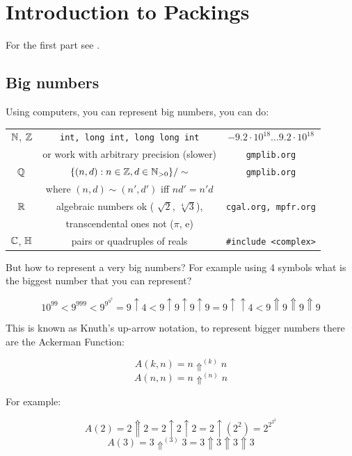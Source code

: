 \setcounter{chapter}{5}
\chapter{Introduction to Packings}



For the first part see \cite{Pfeifle}.
\section{Big numbers}

Using computers, you can represent big numbers, you can do: 

\renewcommand{\arraystretch}{1.5}
\begin{tabular}{|c|c|c|}
\hline
$\mathbb{N}$, $\mathbb{Z}$	 	&\texttt{int, long int, long long int} 			&$-9.2 \cdot 10^{18} ... 9.2 \cdot 10^{18}$	\\
			&or work with arbitrary precision (slower)		&\texttt{gmplib.org}				\\
\hline
$\mathbb{Q}$			&$\{(n, d) : n \in \mathbb{Z}, d \in \mathbb{N}_{>0} \}/\sim$		&\texttt{gmplib.org}				\\
			&where $(n, d) \sim (n' , d' )$ iff $nd' = n'd$		&						\\
\hline
$\mathbb{R}$			&algebraic numbers ok ( $\sqrt{2}$, $\sqrt[4]{3}$),	&\texttt{cgal.org, mpfr.org}			\\
			&transcendental ones not ($\pi$, e)			&						\\
\hline
$\mathbb{C}$, $\mathbb{H}$		&pairs or quadruples of reals				&\texttt{\#include <complex>}			\\
\hline
\end{tabular}


But how to represent a very big numbers? For example using 4 symbols what is the biggest number that you can represent?

$$10^{99} < 9^{999} < 9^{9^{9^9}} = 9 \uparrow 4 < 9 \uparrow 9 \uparrow 9 \uparrow 9 = 9 \uparrow \uparrow 4 < 9 \Uparrow 9 \Uparrow 9 \Uparrow 9$$

This is known as Knuth's up-arrow notation, to represent bigger numbers there are the Ackerman Function:

$$A(k,n) = n \Uparrow^{(k)} n$$
$$A(n,n) = n \Uparrow^{(n)} n$$

For example:

$$A(2)= 2 \Uparrow 2 = 2 \uparrow 2 \uparrow 2 = 2 \uparrow \left( 2^2\right) = 2^{2^{2^2}}$$
$$A(3)= 3 \Uparrow^{(3)} 3 = 3 \Uparrow 3 \Uparrow 3 \Uparrow 3$$

